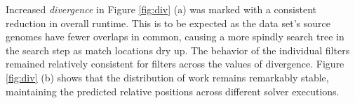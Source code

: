 Increased \textit{divergence} in Figure \ref{fig:div} (a) was marked with a consistent reduction in overall runtime. This is to be expected as the data set's \glspl{source genome} have fewer overlaps in common, causing a more spindly search tree in the \gls{search step} as \glspl{match location} dry up. The  behavior of the individual filters remained relatively consistent for filters across the values of divergence. Figure \ref{fig:div} (b) shows that the distribution of work remains remarkably stable, maintaining the predicted relative positions across different solver executions.

\FloatBarrier